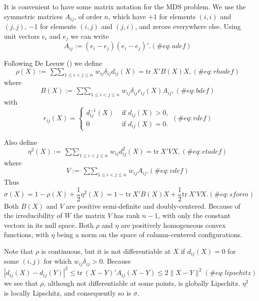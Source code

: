 \documentclass[
  12pt,
  letterpaper,
  DIV=11,
  numbers=noendperiod]{scrartcl}
\begin{document}
It is convenient to have some matrix notation for the MDS problem. We
use the symmetric matrices \(A_{ij}\), of order \(n\), which have \(+1\)
for elements \((i,i)\) and \((j,j)\), \(-1\) for elements \((i,j)\) and
\((j,i)\), and zeroes everywhere else. Using unit vectors \(e_i\) and
\(e_j\) we can write \begin{equation}
A_{ij}:=(e_i-e_j)(e_i-e_j)'.
(\#eq:adef)
\end{equation}

Following De Leeuw () we define
\begin{equation}
\rho(X):=\mathop{\sum\sum}_{1\leq i<j\leq n} w_{ij}\delta_{ij}d_{ij}(X)=\text{tr}\ X'B(X)X,
(\#eq:rhodef)
\end{equation} where \begin{equation}
B(X):=\mathop{\sum\sum}_{1\leq i<j\leq n}w_{ij}\delta_{ij}r_{ij}(X)A_{ij},
(\#eq:bdef)
\end{equation} with \begin{equation}
r_{ij}(X)=\begin{cases}
d_{ij}^{-1}(X)&\text{ if }d_{ij}(X)>0,\\
0&\text{ if }d_{ij}(X)=0.
\end{cases}
(\#eq:rdef)
\end{equation}

Also define \begin{equation}
\eta^2(X):=\mathop{\sum\sum}_{1\leq i<j\leq n}w_{ij}d_{ij}^2(X)=\text{tr}\ X'VX,
(\#eq:etadef)
\end{equation} where \begin{equation}
V:=\mathop{\sum\sum}_{1\leq i<j\leq n}w_{ij}A_{ij}.
(\#eq:vdef)
\end{equation} Thus \begin{equation}
\sigma(X)=1-\rho(X)+\frac12\eta^2(X)=1-\text{tr}\ X'B(X)X+\frac12\text{tr}\ X'VX.
(\#eq:sform)
\end{equation} Both \(B(X)\) and \(V\) are positive semi-definite and
doubly-centered. Because of the irreducibility of \(W\) the matrix \(V\)
has rank \(n-1\), with only the constant vectors in its null space. Both
\(\rho\) and \(\eta\) are positively homogeneous convex functions, with
\(\eta\) being a norm on the space of column-centered configurations.

Note that \(\rho\) is continuous, but it is not differentiable at \(X\)
if \(d_{ij}(X)=0\) for some \((i,j)\) for which \(w_{ij}\delta_{ij}>0\).
Because \begin{equation}
|d_{ij}(X)-d_{ij}(Y)|^2\leq\text{tr}\ (X-Y)'A_{ij}(X-Y)\leq 2\|X-Y\|^2
(\#eq:lipschitz)
\end{equation} we see that \(\rho\), although not differentiable at some
points, is globally Lipschitz. \(\eta^2\) is locally Lipschitz, and
consequently so is \(\sigma\).
\end{document}
